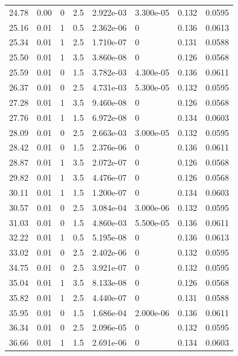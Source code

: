 \documentclass[preview]{standalone}
\begin{document}
{{{\begin{tabular}{L{1.2cm}C{1.2cm} C{0.3cm}C{0.5cm} C{1.4cm}C{1.4cm} C{1.4cm}C{1.4cm}}
  24.78  &  0.00  & 0     & 2.5 &  2.922e-03  & 3.300e-05  & 0.132 &  0.0595   \\ 
  25.16  &  0.01  & 1     & 0.5 &  2.362e-06  & 0  & 0.136 &  0.0613   \\ 
  25.34  &  0.01  & 1     & 2.5 &  1.710e-07  & 0  & 0.131 &  0.0588   \\ 
  25.50  &  0.01  & 1     & 3.5 &  3.860e-08  & 0  & 0.126 &  0.0568   \\ 
  25.59  &  0.01  & 0     & 1.5 &  3.782e-03  & 4.300e-05  & 0.136 &  0.0611   \\ 
  26.37  &  0.01  & 0     & 2.5 &  4.731e-03  & 5.300e-05  & 0.132 &  0.0595   \\ 
  27.28  &  0.01  & 1     & 3.5 &  9.460e-08  & 0  & 0.126 &  0.0568   \\ 
  27.76  &  0.01  & 1     & 1.5 &  6.972e-08  & 0  & 0.134 &  0.0603   \\ 
  28.09  &  0.01  & 0     & 2.5 &  2.663e-03  & 3.000e-05  & 0.132 &  0.0595   \\ 
  28.42  &  0.01  & 0     & 1.5 &  2.376e-06  & 0  & 0.136 &  0.0611   \\ 
  28.87  &  0.01  & 1     & 3.5 &  2.072e-07  & 0  & 0.126 &  0.0568   \\ 
  29.82  &  0.01  & 1     & 3.5 &  4.476e-07  & 0  & 0.126 &  0.0568   \\ 
  30.11  &  0.01  & 1     & 1.5 &  1.200e-07  & 0  & 0.134 &  0.0603   \\ 
  30.57  &  0.01  & 0     & 2.5 &  3.084e-04  & 3.000e-06  & 0.132 &  0.0595   \\ 
  31.03  &  0.01  & 0     & 1.5 &  4.860e-03  & 5.500e-05  & 0.136 &  0.0611   \\ 
  32.22  &  0.01  & 1     & 0.5 &  5.195e-08  & 0  & 0.136 &  0.0613   \\ 
  33.02  &  0.01  & 0     & 2.5 &  2.402e-06  & 0  & 0.132 &  0.0595   \\ 
  34.75  &  0.01  & 0     & 2.5 &  3.921e-07  & 0  & 0.132 &  0.0595   \\ 
  35.04  &  0.01  & 1     & 3.5 &  8.133e-08  & 0  & 0.126 &  0.0568   \\ 
  35.82  &  0.01  & 1     & 2.5 &  4.440e-07  & 0  & 0.131 &  0.0588   \\ 
  35.95  &  0.01  & 0     & 1.5 &  1.686e-04  & 2.000e-06  & 0.136 &  0.0611   \\ 
  36.34  &  0.01  & 0     & 2.5 &  2.096e-05  & 0  & 0.132 &  0.0595   \\ 
  36.66  &  0.01  & 1     & 1.5 &  2.691e-06  & 0  & 0.134 &  0.0603   \\ 

\end{tabular}}}}
\end{document}
